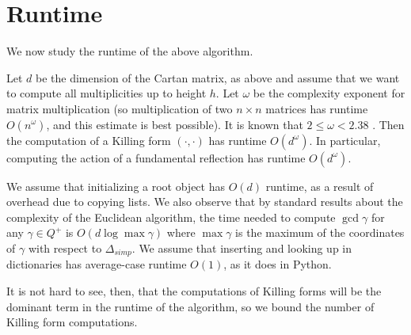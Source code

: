 \documentclass[12pt]{article}
\theoremstyle{definition}
\begin{document}
\section{Runtime}
We now study the runtime of the above algorithm.

Let $d$ be the dimension of the Cartan matrix, as above and assume that we want to compute all multiplicities up to height $h$. Let $\omega$ be the complexity exponent for matrix multiplication (so multiplication of two $n \times n$ matrices has runtime $O(n^\omega)$, and this estimate is best possible). It is known that $2 \leq \omega < 2.38$ \cite{williams2014multiplying}. Then the computation of a Killing form $(\cdot, \cdot)$ has runtime $O(d^\omega)$. In particular, computing the action of a fundamental reflection has runtime $O(d^\omega)$.

We assume that initializing a root object has $O(d)$ runtime, as a result of overhead due to copying lists. We also observe that by standard results about the complexity of the Euclidean algorithm, the time needed to compute $\gcd \gamma$ for any $\gamma \in Q^+$ is $O(d\log \max \gamma)$ where $\max \gamma$ is the maximum of the coordinates of $\gamma$ with respect to $\Delta_{simp}$. We assume that inserting and looking up in dictionaries has average-case runtime $O(1)$, as it does in Python.

It is not hard to see, then, that the computations of Killing forms will be the dominant term in the runtime of the algorithm, so we bound the number of Killing form computations.
\end{document}

